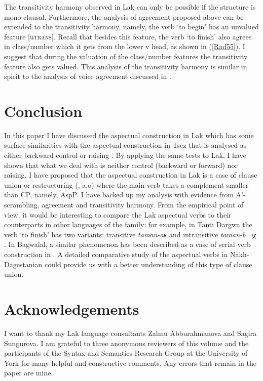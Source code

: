 \documentclass[output=paper]{langscibook}
\begin{document}
The transitivity harmony observed in Lak can only be possible if the structure is mono-clausal. Furthermore, the analysis of agreement proposed above can be extended to the transitivity harmony, namely, the verb ‘to begin’ has an unvalued feature [u\textsc{trans}]. Recall that besides this feature, the verb ‘to finish’ also agrees in class/number which it gets from the lower v head, as shown in (\ref{Rad55}). I suggest that during the valuation of the class/number features the transitivity feature also gets valued. This analysis of the transitivity harmony is similar in spirit to the analysis of voice agreement discussed in \citet{WurmbrandShimamura2017}.

\section{Conclusion}
In this paper I have discussed the aspectual construction in Lak which has some surface similarities with the aspectual construction in Tsez that is analysed as either backward control or raising \citep{PolinskyPotsdam2002}. By applying the same tests to Lak, I have shown that what we deal with is neither control (backward or forward) nor raising. I have proposed that the aspectual construction in Lak is a case of clause union or restructuring (\citet{wurmbrand2001,Wurmbrand2004,wurmbrand2015}, a.o) where the main verb takes a complement smaller than CP, namely, AspP. I have backed up my analysis with evidence from A’-scrambling, agreement and transitivity harmony. From the empirical point of view, it would be interesting to compare the Lak aspectual verbs to their counterparts in other languages of the family: for example, in Tanti Dargwa the verb ‘to finish’ has two variants: transitive \textit{taman-aʁ} and intransitive \textit{taman-b=iχ} \citep{SumbatovaLander2014}. In Bagwalal, a similar phenomenon has been described as a case of serial verb construction in \citet[119-125]{Tatevosov2001}. A detailed comparative study of the aspectual verbs in Nakh-Dagestanian could provide us with a better understanding of this type of clause union. 


\section*{Acknowledgements}
I want to thank my Lak language consultants Zalmu Abburahmanova and Sagira Sungurova. I am grateful to three anonymous reviewers of this volume and the participants of the Syntax and Semantics Research Group at the University of York for many helpful and constructive comments. Any errors that remain in the paper are mine.
\end{document}
